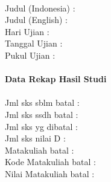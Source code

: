 \begin{center}
\begin{tabbing}
	\HRule 	\\
	Judul (Indonesia)		\>	: \@titleind \\
	Judul (English)			\>	: \@titleeng \\	
	Hari Ujian				\>	: \@examday \\
	Tanggal Ujian			\>	: \@examdate \\
	Pukul Ujian	 			\>	: \@examtime \\
	\HRule	\\
	{\bfseries Data Rekap Hasil Studi}	\\
	\HRule 	\\	
	Jml sks sblm batal		\>	: \@sksbatalsebelum \\
	Jml sks ssdh batal		\>	: \@sksbatalsesudah \\
	Jml sks yg dibatal		\>	: \@sksbatal \\
	Jml sks nilai D			\>	: \@sksD \\
	Matakuliah batal		\>	: \@matakuliahbatal \\
	Kode Matakuliah batal	\>	: \@kodebatal \\
	Nilai Matakuliah batal	\>	: \@nilaibatal \\
\end{tabbing}
\end{center}
